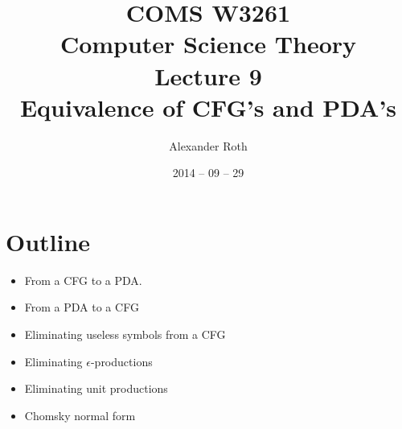 \documentclass[]{article}
\begin{document}
\newcommand*{\xml}[1]{\texttt{<#1>}}

\title{COMS W3261 \\ Computer Science Theory \\ Lecture 9\\ Equivalence of CFG's 
and PDA's}
\author{Alexander Roth}
\date{2014 -- 09 -- 29}
\maketitle

\section*{Outline}
  \begin{itemize}
    \item From a CFG to a PDA.
    \item From a PDA to a CFG
    \item Eliminating useless symbols from a CFG
    \item Eliminating $\epsilon$-productions
    \item Eliminating unit productions
    \item Chomsky normal form
  \end{itemize}
  
\end{document}

